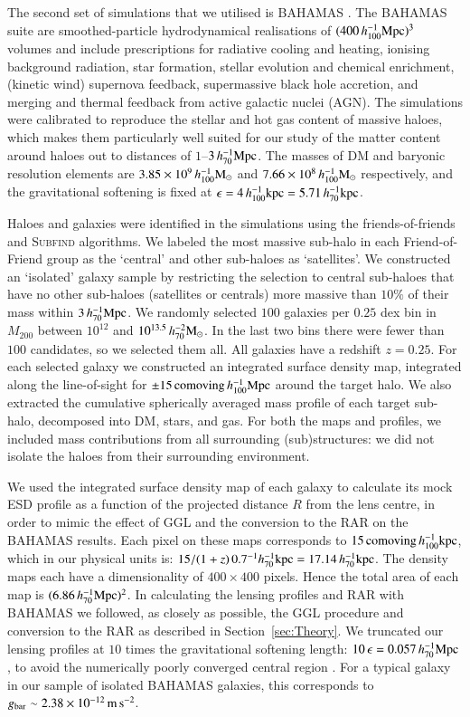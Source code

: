 \documentclass{aa}
\newcommand{\hmsun}{\,h_{70}^{-2} {\rm M_\odot}}
\newcommand{\hkpc}{\,h_{70}^{-1}{\rm{kpc}} }
\newcommand{\hMpc}{\,h_{70}^{-1}{\rm{Mpc}} }
\newcommand{\mpss}{\,{\rm m}\,{\rm s}^{-2} }
\newcommand*{\E}[1]{\times 10^{#1}}
\newcommand{\un}[1]{_{\rm #1}}
\begin{document}
The second set of simulations that we utilised is BAHAMAS \cite[]{mccarthy2017}. The BAHAMAS suite are smoothed-particle hydrodynamical realisations of $(400 \, h_{100}^{-1} {\rm Mpc})^3$ volumes and include prescriptions for radiative cooling and heating, ionising background radiation, star formation, stellar evolution and chemical enrichment, (kinetic wind) supernova feedback, supermassive black hole accretion, and merging and thermal feedback from active galactic nuclei (AGN). The simulations were calibrated to reproduce the stellar and hot gas content of massive haloes, which makes them particularly well suited for our study of the matter content around haloes out to distances of $1$--$3\hMpc$. The masses of DM and baryonic resolution elements are $3.85\times 10^9 \, h_{100}^{-1} {\rm M_\odot}$ and $7.66\times 10^8 \, h_{100}^{-1} {\rm M_\odot}$ respectively, and the gravitational softening is fixed at $\epsilon = 4 \, h_{100}^{-1} {\rm kpc} = 5.71 \hkpc$.

Haloes and galaxies were identified in the simulations using the friends-of-friends \citep{davis1985} and \textsc{Subfind} \citep{springel2001a,dolag2009} algorithms. We labeled the most massive sub-halo in each Friend-of-Friend group as the `central' and other sub-haloes as `satellites'. We constructed an `isolated' galaxy sample by restricting the selection to central sub-haloes that have no other sub-haloes (satellites or centrals) more massive than $10\%$ of their mass within $3 \hMpc$. We randomly selected $100$ galaxies per $0.25$ dex bin in $M_{200}$ between $10^{12}$ and $10^{13.5} \hmsun$. In the last two bins there were fewer than $100$ candidates, so we selected them all. All galaxies have a redshift $z=0.25$. For each selected galaxy we constructed an integrated surface density map, integrated along the line-of-sight for $\pm 15 \, {\rm comoving} \, h_{100}^{-1} {\rm Mpc}$ around the target halo. We also extracted the cumulative spherically averaged mass profile of each target sub-halo, decomposed into DM, stars, and gas. For both the maps and profiles, we included mass contributions from all surrounding (sub)structures: we did not isolate the haloes from their surrounding environment.

We used the integrated surface density map of each galaxy to calculate its mock ESD profile as a function of the projected distance $R$ from the lens centre, in order to mimic the effect of GGL and the conversion to the RAR on the BAHAMAS results. Each pixel on these maps corresponds to $15 \, {\rm comoving} \, h_{100}^{-1} {\rm kpc}$, which in our physical units is: $15 / (1+z) \, 0.7^{-1} h_{70}^{-1} {\rm kpc} = 17.14 \hkpc$. The density maps each have a dimensionality of $400 \times 400$ pixels. Hence the total area of each map is $(6.86 \hMpc)^2$. In calculating the lensing profiles and RAR with BAHAMAS we followed, as closely as possible, the GGL procedure and conversion to the RAR as described in Section~\ref{sec:Theory}. We truncated our lensing profiles at $10$ times the gravitational softening length: $10 \, \epsilon = 0.057 \hMpc$, to avoid the numerically poorly converged central region \cite[]{power2003}. For a typical galaxy in our sample of isolated BAHAMAS galaxies, this corresponds to $g\un{bar}\sim2.38\E{-12} \mpss$.
\end{document}
